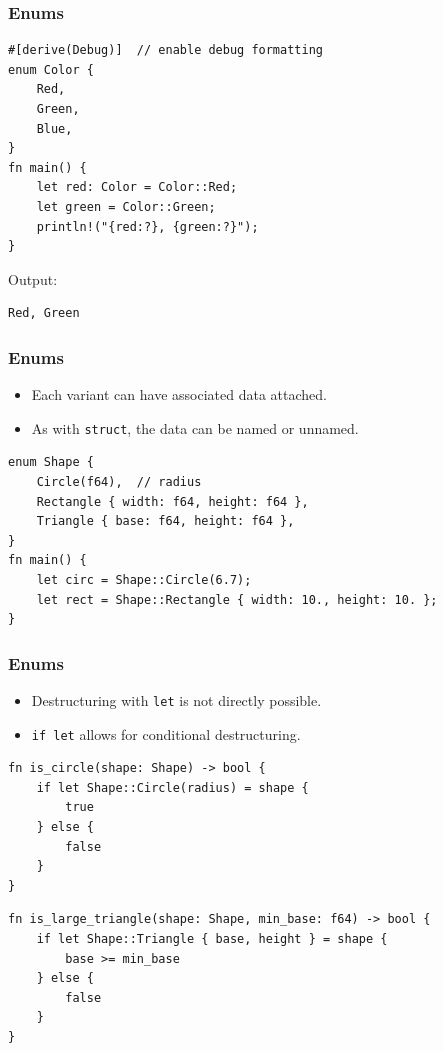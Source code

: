 \begin{frame}[fragile]
    \frametitle{Enums}
    \pause
    \vfill
    \begin{verbatim}
#[derive(Debug)]  // enable debug formatting
enum Color {
    Red,
    Green,
    Blue,
}
fn main() {
    let red: Color = Color::Red;
    let green = Color::Green;
    println!("{red:?}, {green:?}");
}
    \end{verbatim}
    \pause
    \vfill
    Output:
    \begin{verbatim}
Red, Green
    \end{verbatim}
\end{frame}

\begin{frame}[fragile]
    \frametitle{Enums}
    \begin{itemize}
        \item Each variant can have associated data attached.
        \item As with \texttt{struct}, the data can be named or unnamed.
    \end{itemize}
    \pause
    \vfill
    \begin{verbatim}
enum Shape {
    Circle(f64),  // radius
    Rectangle { width: f64, height: f64 },
    Triangle { base: f64, height: f64 },
}
fn main() {
    let circ = Shape::Circle(6.7);
    let rect = Shape::Rectangle { width: 10., height: 10. };
}
    \end{verbatim}
\end{frame}

\begin{frame}[fragile]
    \frametitle{Enums}
    \begin{itemize}
        \item Destructuring with \texttt{let} is not directly possible.
        \item \texttt{if let} allows for conditional destructuring.
    \end{itemize}
    \pause
    \vfill
    \begin{verbatim}
fn is_circle(shape: Shape) -> bool {
    if let Shape::Circle(radius) = shape {
        true
    } else {
        false
    }
}
    \end{verbatim}
    \pause
    \vfill
    \begin{verbatim}
fn is_large_triangle(shape: Shape, min_base: f64) -> bool {
    if let Shape::Triangle { base, height } = shape {
        base >= min_base
    } else {
        false
    }
}
    \end{verbatim}
\end{frame}

